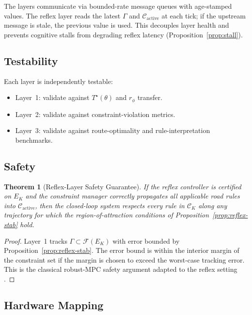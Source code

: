\documentclass[11pt,twocolumn]{article}
\newtheorem{theorem}{Theorem}
\theoremstyle{definition}
\theoremstyle{remark}
\newcommand{\Feas}{\mathcal{F}}
\newcommand{\cC}{\mathcal{C}}
\begin{document}
The layers communicate via bounded-rate message queues with age-stamped values. The reflex layer reads the latest $\Gamma$ and $\cC_{\mathrm{active}}$ at each tick; if the upstream message is stale, the previous value is used. This decouples layer health and prevents cognitive stalls from degrading reflex latency (Proposition~\ref{prop:stall}).

\subsection{Testability}

Each layer is independently testable:
\begin{itemize}[leftmargin=*,itemsep=2pt]
\item Layer~1: validate against $T^{\star}(\theta)$ and $r_\phi$ transfer.
\item Layer~2: validate against constraint-violation metrics.
\item Layer~3: validate against route-optimality and rule-interpretation benchmarks.
\end{itemize}

\subsection{Safety}

\begin{theorem}[Reflex-Layer Safety Guarantee]\label{thm:safety}
If the reflex controller is certified on $E_K$ and the constraint manager correctly propagates all applicable road rules into $\cC_{\mathrm{active}}$, then the closed-loop system respects every rule in $\cC_K$ along any trajectory for which the region-of-attraction conditions of Proposition~\ref{prop:reflex-stab} hold.
\end{theorem}

\begin{proof}
Layer~1 tracks $\Gamma \subset \Feas(E_K)$ with error bounded by Proposition~\ref{prop:reflex-stab}. The error bound is within the interior margin of the constraint set if the margin is chosen to exceed the worst-case tracking error. This is the classical robust-MPC safety argument adapted to the reflex setting \cite{kelly2008controlvehicle,rosolia2019learning}.
\end{proof}

\subsection{Hardware Mapping}
\end{document}
